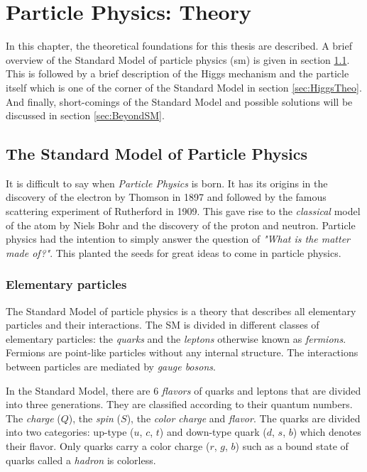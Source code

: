 \chapter{Particle Physics: Theory}
\label{chap:Theory}

In this chapter, the theoretical foundations for this thesis are described. A brief overview of the Standard Model of particle physics (\acrshort{sm}) is given in section \ref{sec:SM}. This is followed by a brief description of the Higgs mechanism and the particle itself which is one of the corner of the Standard Model in section \ref{sec:HiggsTheo}. And finally, short-comings of the Standard Model and possible solutions will be discussed in section \ref{sec:BeyondSM}.

\section{The Standard Model of Particle Physics}
\label{sec:SM}

It is difficult to say when \textit{Particle Physics} is born. It has its origins in the discovery of the electron by Thomson \cite{JJThomson:1897} in 1897 and followed by the famous scattering experiment of Rutherford \cite{Rutherford:1911} in 1909. This gave rise to the \textit{classical} model of the atom by Niels Bohr and the discovery of the proton and neutron. Particle physics had the intention to simply answer the question of \textit{"What is the matter made of?"}. This planted the seeds for great ideas to come in particle physics.

\subsection{Elementary particles}

The Standard Model of particle physics is a theory that describes all elementary particles and their interactions. The SM is divided in different classes of elementary particles: the \textit{quarks} and the \textit{leptons} otherwise known as \textit{fermions}. Fermions are point-like particles without any internal structure. The interactions between particles are mediated by \textit{gauge bosons}.

In the Standard Model, there are 6 \textit{flavors} of quarks and leptons that are divided into three generations. They are classified according to their quantum numbers. The \textit{charge} ($Q$), the \textit{spin} ($S$), the \textit{color charge} and \textit{flavor}. The quarks are divided into two categories: up-type ($u$, $c$, $t$) and down-type quark ($d$, $s$, $b$) which denotes their flavor. Only quarks carry a color charge ($r$, $g$, $b$) such as a bound state of quarks called a \textit{hadron} is colorless.

